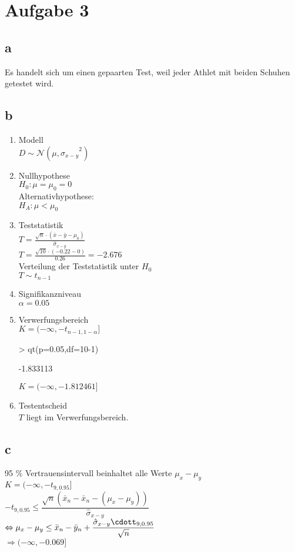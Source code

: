 

\section{Aufgabe 3}

\subsection{a}
Es handelt sich um einen gepaarten Test, weil jeder Athlet mit beiden Schuhen 
getestet wird. 

\subsection{b}
\begin{enumerate}
  \item Modell \\
    $ D \sim \mathcal{N}(\mu,{\hat{\sigma}_{x-y}}^2)$
  \item Nullhypothese \\
    $H_0: \mu=\mu_0=0$\\
    Alternativhypothese: \\
    $H_A: \mu<\mu_0$
  \item Teststatistik \\
    $T = \frac{\sqrt{n}\cdot(\bar{x}-\bar{y}-\mu_0)}{\hat{\sigma}_{x-y}}$ \\
    $T = \frac{\sqrt{10}\cdot(-0.22-0)}{0.26} = -2.676$ \\
    Verteilung der Teststatistik unter $H_0$\\
    $T \sim t_{n-1}$
  \item Signifikanzniveau \\
    $\alpha=0.05$
  \item Verwerfungsbereich \\
    $K = (-\infty,-t_{n-1,1-\alpha}]$
\begin{Schunk}
\begin{Sinput}
> qt(p=0.05,df=10-1)
\end{Sinput}
\begin{Soutput}
[1] -1.833113
\end{Soutput}
\end{Schunk}
    $K = (-\infty,-1.812461]$
  \item Testentscheid \\
    $T$ liegt im Verwerfungsbereich. 
\end{enumerate}

\subsection{c}
95 \% Vertrauensintervall beinhaltet alle Werte $\mu_x - \mu_y$ \\
$K=(-\infty, -t_{9,0.95}]$\\
$-t_{9,0.95} \leq 
\dfrac{\sqrt{n} (\bar{x}_n-\bar{x}_n-(\mu_x-\mu_y))}{\hat{\sigma}_{x-y}}$ \\
$\Leftrightarrow 
\mu_x-\mu_y \leq \bar{x}_n-\bar{y}_n+
\dfrac{\hat{\sigma}_{x-y}\cdott_{9,0.95}}{\sqrt{n}}$ \\
$\Rightarrow (-\infty,-0.069]$
